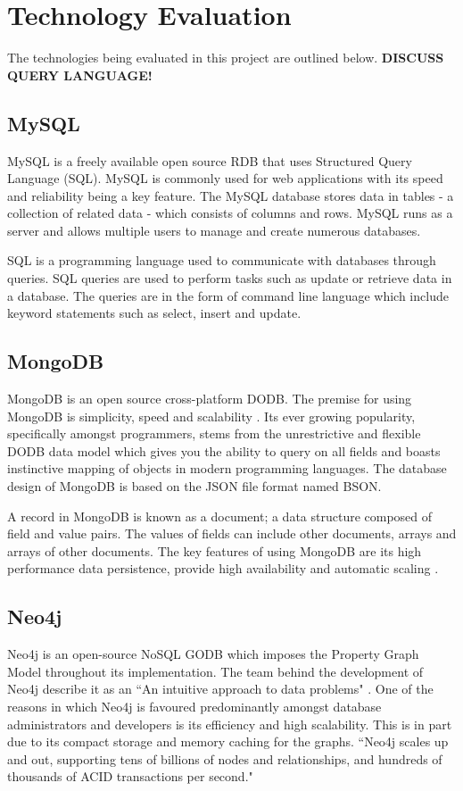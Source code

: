 \section{Technology Evaluation}\label{techeval}
The technologies being evaluated in this project are outlined below. \textbf{ DISCUSS QUERY LANGUAGE!}

\subsection{MySQL}\label{mysql}
MySQL is a freely available open source RDB that uses Structured Query Language (SQL). MySQL is commonly used for web applications with its speed and reliability being a key feature. The MySQL database stores data in tables - a collection of related data - which consists of columns and rows. MySQL runs as a server and allows multiple users to manage and create numerous databases. 

SQL is a programming language used to communicate with databases through queries. SQL queries are used to perform tasks such as update or retrieve data in a database. The queries are in the form of command line language which include keyword statements such as select, insert and update.

\subsection{MongoDB}\label{mongo}
MongoDB is an open source cross-platform DODB. The premise for using MongoDB is simplicity, speed and scalability  \cite{md}. Its ever growing popularity, specifically amongst programmers, stems from the unrestrictive and flexible DODB data model which gives you the ability to query on all fields and boasts instinctive mapping of objects in modern programming languages. \cite{md} The database design of MongoDB is based on the JSON file format named BSON. 

A record in MongoDB is known as a document; a data structure composed of field and value pairs. The values of fields can include other documents, arrays and arrays of other documents. The key features of using MongoDB are its high performance data persistence, provide high availability and automatic scaling  \cite{md}.

\subsection{Neo4j}\label{neo}
Neo4j is an open-source NoSQL GODB which imposes the Property Graph Model throughout its implementation. The team behind the development of Neo4j describe it as an ``An intuitive approach to data problems" \cite{ndweb}. One of the reasons in which Neo4j is favoured predominantly amongst database administrators and developers is its efficiency and high scalability. This is in part due to its compact storage and memory caching for the graphs. ``Neo4j scales up and out, supporting tens of billions of nodes and relationships, and hundreds of thousands of ACID transactions per second." \cite{ndweb}

